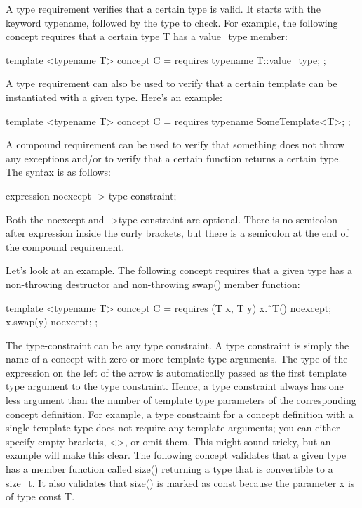 
A type requirement verifies that a certain type is valid. It starts with the keyword typename, followed by the type to check. For example, the following concept requires that a certain type T has a value\_type member:

\begin{cpp}
template <typename T>
concept C = requires { typename T::value_type; };
\end{cpp}

A type requirement can also be used to verify that a certain template can be instantiated with a given type. Here’s an example:

\begin{cpp}
template <typename T>
concept C = requires { typename SomeTemplate<T>; };
\end{cpp}



A compound requirement can be used to verify that something does not throw any exceptions and/or to verify that a certain function returns a certain type. The syntax is as follows:

\begin{cpp}
{ expression } noexcept -> type-constraint;
\end{cpp}

Both the noexcept and ->type-constraint are optional. There is no semicolon after expression inside the curly brackets, but there is a semicolon at the end of the compound requirement.

Let’s look at an example. The following concept requires that a given type has a non-throwing destructor and non-throwing swap() member function:

\begin{cpp}
template <typename T>
concept C = requires (T x, T y) {
    { x.˜T()} noexcept;
    { x.swap(y) } noexcept;
};
\end{cpp}

The type-constraint can be any type constraint. A type constraint is simply the name of a concept with zero or more template type arguments. The type of the expression on the left of the arrow is automatically passed as the first template type argument to the type constraint. Hence, a type constraint always has one less argument than the number of template type parameters of the corresponding concept definition. For example, a type constraint for a concept definition with a single template type does not require any template arguments; you can either specify empty brackets, <>, or omit them. This might sound tricky, but an example will make this clear. The following concept validates that a given type has a member function called size() returning a type that is convertible to a size\_t. It also validates that size() is marked as const because the parameter x is of type const T.

